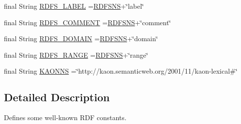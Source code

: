 \begin{DoxyCompactItemize}
\item 
final String \hyperlink{interfaceorg_1_1semanticweb_1_1owlapi_1_1rdf_1_1util_1_1_r_d_f_constants_a35ac186e48acb43fc4057bf03809ec1e}{R\-D\-F\-S\-\_\-\-L\-A\-B\-E\-L} =\hyperlink{interfaceorg_1_1semanticweb_1_1owlapi_1_1rdf_1_1util_1_1_r_d_f_constants_a7d56e95bac1e7dbb83f818ed1b237f37}{R\-D\-F\-S\-N\-S}+\char`\"{}label\char`\"{}
\item 
final String \hyperlink{interfaceorg_1_1semanticweb_1_1owlapi_1_1rdf_1_1util_1_1_r_d_f_constants_a31fba01a3182172fca1137e9618f5249}{R\-D\-F\-S\-\_\-\-C\-O\-M\-M\-E\-N\-T} =\hyperlink{interfaceorg_1_1semanticweb_1_1owlapi_1_1rdf_1_1util_1_1_r_d_f_constants_a7d56e95bac1e7dbb83f818ed1b237f37}{R\-D\-F\-S\-N\-S}+\char`\"{}comment\char`\"{}
\item 
final String \hyperlink{interfaceorg_1_1semanticweb_1_1owlapi_1_1rdf_1_1util_1_1_r_d_f_constants_aa603fe5c6922433241d15d513ecdb007}{R\-D\-F\-S\-\_\-\-D\-O\-M\-A\-I\-N} =\hyperlink{interfaceorg_1_1semanticweb_1_1owlapi_1_1rdf_1_1util_1_1_r_d_f_constants_a7d56e95bac1e7dbb83f818ed1b237f37}{R\-D\-F\-S\-N\-S}+\char`\"{}domain\char`\"{}
\item 
final String \hyperlink{interfaceorg_1_1semanticweb_1_1owlapi_1_1rdf_1_1util_1_1_r_d_f_constants_ab81141faf386eaf5a9eb0cad25f04f82}{R\-D\-F\-S\-\_\-\-R\-A\-N\-G\-E} =\hyperlink{interfaceorg_1_1semanticweb_1_1owlapi_1_1rdf_1_1util_1_1_r_d_f_constants_a7d56e95bac1e7dbb83f818ed1b237f37}{R\-D\-F\-S\-N\-S}+\char`\"{}range\char`\"{}
\item 
final String \hyperlink{interfaceorg_1_1semanticweb_1_1owlapi_1_1rdf_1_1util_1_1_r_d_f_constants_a517a9c3779e60b775f41dc4ab7e0a059}{K\-A\-O\-N\-N\-S} =\char`\"{}http\-://kaon.\-semanticweb.\-org/2001/11/kaon-\/lexical\#\char`\"{}
\end{DoxyCompactItemize}


\subsection{Detailed Description}
Defines some well-\/known R\-D\-F constants. 

